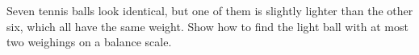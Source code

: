 Seven tennis balls look identical, but one of them is slightly lighter than the other six, which all have the same weight. Show how to find the light ball with at most two weighings on a balance scale.
